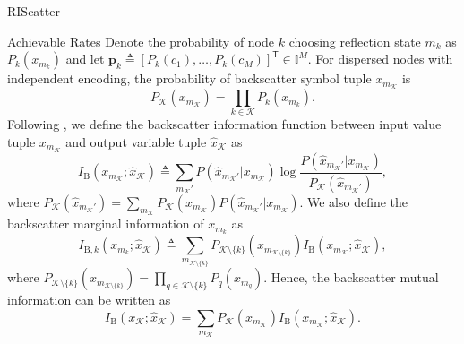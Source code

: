 \documentclass[journal]{IEEEtran}
\begin{document}
\begin{section}{RIScatter}
	\begin{subsection}{Achievable Rates}
		Denote the probability of node $k$ choosing reflection state $m_k$ as $P_k(x_{m_k})$ and let $\boldsymbol{p}_k \triangleq [P_k(c_1),\ldots,P_k(c_M)]^\mathsf{T} \in \mathbb{I}^{M}$.
		For dispersed nodes with independent encoding, the probability of backscatter symbol tuple $x_{m_{\mathcal{K}}}$ is
		\begin{equation}
			P_{\mathcal{K}}(x_{m_{\mathcal{K}}}) = \prod_{k \in \mathcal{K}} P_k(x_{m_k}).
			\label{eq:equivalent_distribution}
		\end{equation}
		Following \cite{Rezaeian2004}, we define the backscatter information function between input value tuple $x_{m_{\mathcal{K}}}$ and output variable tuple $\hat{x}_{\mathcal{K}}$ as
		\begin{equation}
			I_{\text{B}}(x_{m_{\mathcal{K}}};\hat{x}_{\mathcal{K}}) \triangleq \sum_{m_{\mathcal{K}}'} P(\hat{x}_{m_{\mathcal{K}}'}|x_{m_{\mathcal{K}}}) \log \frac{P(\hat{x}_{m_{\mathcal{K}}'}|x_{m_{\mathcal{K}}})}{P_{\mathcal{K}}(\hat{x}_{m_{\mathcal{K}}'})},
			\label{eq:backscatter_information_function}
		\end{equation}
		where $P_{\mathcal{K}}(\hat{x}_{m_{\mathcal{K}}'}) = \sum_{m_{\mathcal{K}}} P_{\mathcal{K}}(x_{m_{\mathcal{K}}}) P(\hat{x}_{m_{\mathcal{K}}'}|x_{m_{\mathcal{K}}})$.
		We also define the backscatter marginal information of $x_{m_k}$ as
		\begin{equation}
			I_{\text{B},k}(x_{m_k};\hat{x}_{\mathcal{K}}) \triangleq \sum_{m_{\mathcal{K} \setminus \{k\}}} P_{\mathcal{K} \setminus \{k\}}(x_{m_{\mathcal{K} \setminus \{k\}}}) I_{\text{B}}(x_{m_{\mathcal{K}}};\hat{x}_{\mathcal{K}}),
			\label{eq:backscatter_marginal_information}
		\end{equation}
		where $P_{\mathcal{K} \setminus \{k\}}(x_{m_{\mathcal{K} \setminus \{k\}}}) = \prod_{q \in \mathcal{K} \setminus \{k\}} P_{q}(x_{m_{q}})$.
		Hence, the backscatter mutual information can be written as
		\begin{equation}
			I_{\text{B}}(x_{\mathcal{K}};\hat{x}_{\mathcal{K}}) = \sum_{m_{\mathcal{K}}} P_{\mathcal{K}}(x_{m_{\mathcal{K}}}) I_{\text{B}}(x_{m_{\mathcal{K}}};\hat{x}_{\mathcal{K}}).
			\label{eq:backscatter_mutual_information}
		\end{equation}


\end{subsection}
\end{section}
\end{document}
